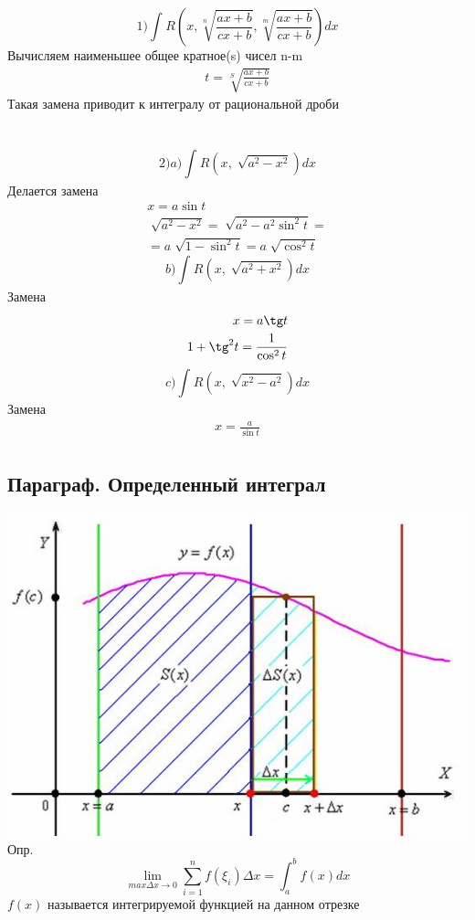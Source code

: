 \documentclass[a4paper, 12pt]{article}
\begin{document}
\[
  1) \int_{}^{}R\left(x,\sqrt[n]{\frac{ax+b}{cx+b}},\sqrt[m]{\frac{ax+b}{cx+b}}\right)dx 
\]
Вычисляем наименьшее общее кратное(s) чисел n-m
\begin{align*}
  t = \sqrt[S]{\frac{ax+b}{cx+b}}
\end{align*}
Такая замена приводит к интегралу от рациональной дроби
\\\\\\
\[
  2)a)\int_{}^{}R\left(x,\sqrt[]{a^2-x^2}\right)dx 
\]
Делается замена
\begin{align*}
  x = a\sin t\\
  \sqrt[]{a^2 - x^2} = \sqrt[]{a^2 - a^2\sin^2 t}= \\=a \sqrt[]{1-\sin^2 t} = a \sqrt[]{\cos^2 t}
\end{align*}
\[
  b)\int_{}^{}R\left(x, \sqrt[]{a^2 + x^2}\right)dx 
\]
Замена
\begin{align*}
  x = a\tg t\\
  1 + \tg^2 t = \frac{1}{\cos^2 t}
\end{align*}
\[
  c) \int_{}^{}R\left(x,\sqrt[]{x^2 - a^2}\right)dx 
\]
Замена
\begin{align*}
  x = \frac{a}{\sin t}\\
\end{align*}
\newpage

\subsection{Параграф. Определенный интеграл}
\includegraphics{img/471.jpeg}\\
Опр.
\[
  \lim_{max \Delta x\to 0}\sum_{i=1}^{n}f(\xi_i)\Delta x =\int_{a}^{b}f\left(x\right)dx   
\]
$ f(x) $ называется интегрируемой функцией на данном отрезке
\end{document}
